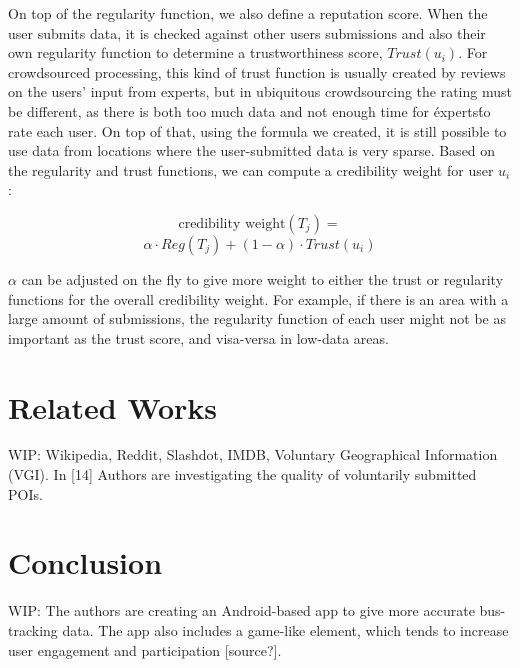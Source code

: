 \documentclass[12pt,twocolumn]{article}
\begin{document}
	    On top of the regularity function, we also define a reputation score. When the user submits data, it is checked against other users submissions and also their own regularity function to determine a trustworthiness score, $Trust(u_i)$. For crowdsourced processing, this kind of trust function is usually created by reviews on the users' input from experts, but in ubiquitous crowdsourcing the rating must be different, as there is both too much data and not enough time for \'experts\' to rate each user. On top of that, using the formula we created, it is still possible to use data from locations where the user-submitted data is very sparse. Based on the regularity and trust functions, we can compute a credibility weight for user $u_i$:
	    
	    $$\text{credibility weight} (T_j) = $$ $$\alpha \cdot Reg(T_j) + (1 - \alpha) \cdot Trust(u_i)$$
	    
        $\alpha$ can be adjusted on the fly to give more weight to either the trust or regularity functions for the overall credibility weight. For example, if there is an area with a large amount of submissions, the regularity function of each user might not be as important as the trust score, and visa-versa in low-data areas.
	    
	\section*{Related Works}
	    WIP: Wikipedia, Reddit, Slashdot, IMDB, Voluntary Geographical Information (VGI). In [14] Authors are investigating the quality of voluntarily submitted POIs.
	    
	\section*{Conclusion}
	    WIP: The authors are creating an Android-based app to give more accurate bus-tracking data. The app also includes a game-like element, which tends to increase user engagement and participation [source?]. 
	
	
\end{document}
